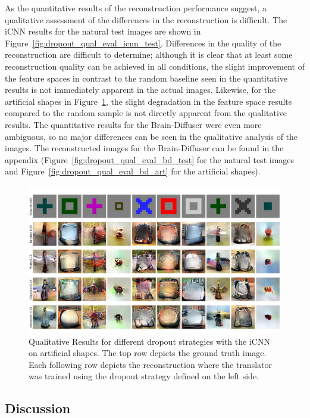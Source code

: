 As the quantitative results of the reconstruction performance suggest, a qualitative assessment of the differences in the reconstruction is difficult. The iCNN results for the natural test images are shown in Figure~\ref{fig:dropout_qual_eval_icnn_test}. Differences in the quality of the reconstruction are difficult to determine; although it is clear that at least some reconstruction quality can be achieved in all conditions, the slight improvement of the feature spaces in contrast to the random baseline  seen in the quantitative results is not immediately apparent in the actual images. Likewise, for the artificial shapes in Figure~\ref{fig:dropout_qual_eval_icnn_art}, the slight degradation in the feature space results compared to the random sample is not directly apparent from the qualitative results. The quantitative results for the Brain-Diffuser were even more ambiguous, so no major differences can be seen in the qualitative analysis of the images. The reconstructed images for the Brain-Diffuser can be found in the appendix (Figure~\ref{fig:dropout_qual_eval_bd_test} for the natural test images and Figure~\ref{fig:dropout_qual_eval_bd_art} for the artificial shapes).


\begin{figure}[ht]
  \centering
  \includegraphics[width=1\textwidth]{plots/dropout_qual_eval_icnn_art.JPEG}
  \caption[Experiment 1: Reconstructed images for iCNN on artificial shapes]{Qualitative Results for different dropout strategies with the iCNN on artificial shapes. The top row depicts the ground truth image. Each following row depicts the reconstruction where the translator was trained using the dropout strategy defined on the left side.}\label{fig:dropout_qual_eval_icnn_art}
\end{figure}

\subsection{Discussion}
  
